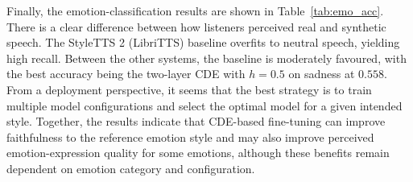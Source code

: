 Finally, the emotion-classification results are shown in Table~\ref{tab:emo_acc}. There is a clear difference between how listeners perceived real and synthetic speech. The StyleTTS 2 (LibriTTS) baseline overfits to neutral speech, yielding high recall. Between the other systems, the baseline is moderately favoured, with the best accuracy being the two-layer \ac{CDE} with $h=0.5$ on sadness at $0.558$. From a deployment perspective, it seems that the best strategy is to train multiple model configurations and select the optimal model for a given intended style. Together, the results indicate that CDE-based fine-tuning can improve faithfulness to the reference emotion style and may also improve perceived emotion-expression quality for some emotions, although these benefits remain dependent on emotion category and configuration.

\begin{table}[t]
  \centering
  \caption{Human emotion-classification accuracy ($\uparrow$).}
  \label{tab:emo_acc}
  \setlength{\tabcolsep}{4pt}
  \end{table}


